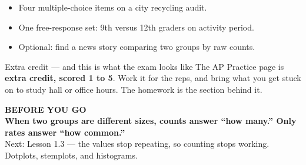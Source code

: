 \documentclass[aspectratio=169, 11pt]{beamer}
\begin{document}
\begin{frame}[t, plain]
  \begin{itemize}\setlength{\itemsep}{5pt}
    \item Four multiple-choice items on a city recycling audit.
    \item One free-response set: 9th versus 12th graders on activity period.
    \item Optional: find a news story comparing two groups by raw counts.
  \end{itemize}
  \begin{block}{Extra credit --- and this is what the exam looks like}
    The AP Practice page is \textbf{extra credit, scored 1 to 5}. Work it for the reps, and bring what you
    get stuck on to study hall or office hours. The  homework is the section
    behind it.
  \end{block}
\end{frame}

{
\begin{frame}[plain]
  \vspace{1.5cm}\hspace{0.8cm}%
  \begin{minipage}{0.86\textwidth}
    {\color{goldacc}\bfseries\small BEFORE YOU GO}\\[0.7cm]
    {\color{white}\bfseries\Large When two groups are different sizes, counts answer
    ``how many.'' Only rates answer ``how common.''}\\[0.9cm]
    {\color{skymid}\small Next: Lesson 1.3 --- the values stop repeating, so counting stops
    working. Dotplots, stemplots, and histograms.}
  \end{minipage}
\end{frame}
}
\end{document}
